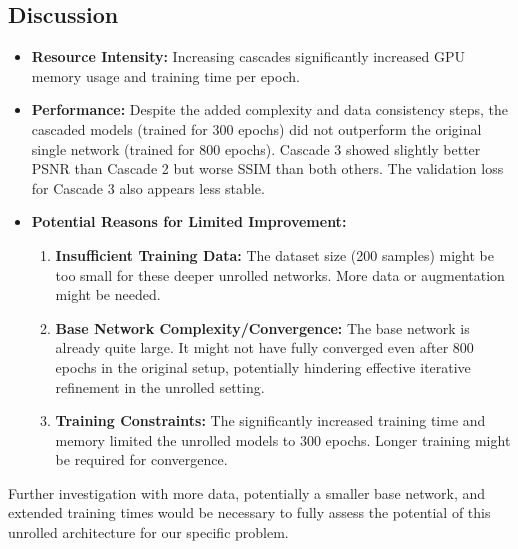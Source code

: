 \documentclass{article}
\begin{document}
\subsection{Discussion}
\begin{itemize}
  \item \textbf{Resource Intensity:} Increasing cascades significantly increased GPU memory usage and training time per epoch.
  \item \textbf{Performance:} Despite the added complexity and data consistency steps, the cascaded models (trained for 300 epochs) did not outperform the original single network (trained for 800 epochs). Cascade 3 showed slightly better PSNR than Cascade 2 but worse SSIM than both others. The validation loss for Cascade 3 also appears less stable.
  \item \textbf{Potential Reasons for Limited Improvement:}
        \begin{enumerate}
          \item \textbf{Insufficient Training Data:} The dataset size (200 samples) might be too small for these deeper unrolled networks. More data or augmentation might be needed.
          \item \textbf{Base Network Complexity/Convergence:} The base network is already quite large. It might not have fully converged even after 800 epochs in the original setup, potentially hindering effective iterative refinement in the unrolled setting.
          \item \textbf{Training Constraints:} The significantly increased training time and memory limited the unrolled models to 300 epochs. Longer training might be required for convergence.
        \end{enumerate}
\end{itemize}
Further investigation with more data, potentially a smaller base network, and extended training times would be necessary to fully assess the potential of this unrolled architecture for our specific problem.


\end{document}
